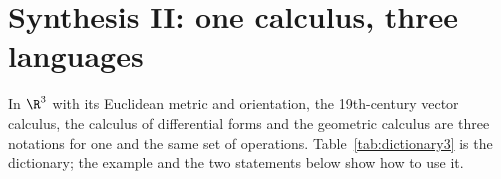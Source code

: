 \section{Synthesis II: one calculus, three languages}\label{sec:synth2}

\begin{synthesis}
In $\R^3$ with its Euclidean metric and orientation, the 19th-century vector calculus, the calculus of differential forms and the geometric calculus
are three notations for one and the same set of operations. Table~\ref{tab:dictionary3} is the dictionary; the example and the two statements below show how to use it.
\end{synthesis}





